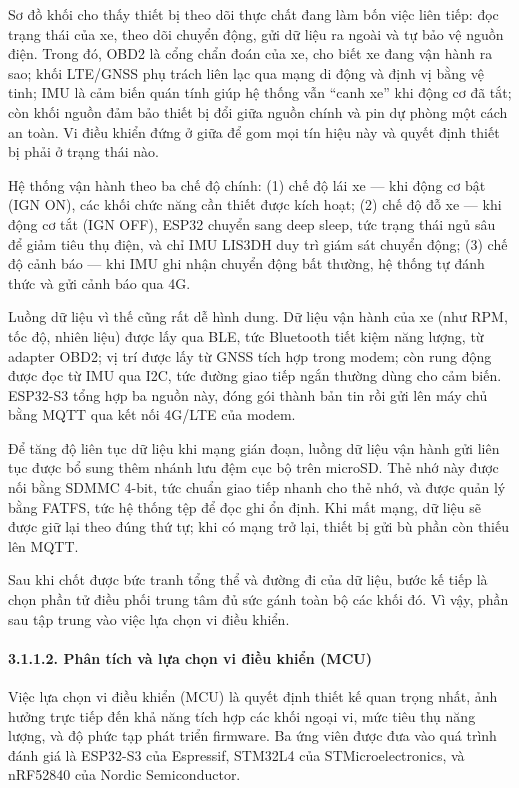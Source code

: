 \documentclass[a4paper]{extarticle}
\begin{document}
Sơ đồ khối cho thấy thiết bị theo dõi thực chất đang làm bốn việc liên tiếp: đọc
trạng thái của xe, theo dõi chuyển động, gửi dữ liệu ra ngoài và tự bảo
vệ nguồn điện. Trong đó, OBD2 là cổng chẩn đoán của xe, cho biết xe đang
vận hành ra sao; khối LTE/GNSS phụ trách liên lạc qua mạng di động và
định vị bằng vệ tinh; IMU là cảm biến quán tính giúp hệ thống vẫn ``canh
xe'' khi động cơ đã tắt; còn khối nguồn đảm bảo thiết bị đổi giữa nguồn
chính và pin dự phòng một cách an toàn. Vi điều khiển đứng ở giữa để gom
mọi tín hiệu này và quyết định thiết bị phải ở trạng thái nào.

Hệ thống vận hành theo ba chế độ chính: (1) chế độ lái xe --- khi động cơ
bật (IGN ON), các khối chức năng cần thiết được kích hoạt; (2) chế độ đỗ
xe --- khi động cơ tắt (IGN OFF), ESP32 chuyển sang deep sleep, tức trạng
thái ngủ sâu để giảm tiêu thụ điện, và chỉ IMU LIS3DH duy trì giám sát
chuyển động; (3) chế độ cảnh báo --- khi IMU ghi nhận chuyển động bất
thường, hệ thống tự đánh thức và gửi cảnh báo qua 4G.

Luồng dữ liệu vì thế cũng rất dễ hình dung. Dữ liệu vận hành của xe
(như RPM, tốc độ, nhiên liệu) được lấy qua BLE, tức Bluetooth tiết kiệm
năng lượng, từ adapter OBD2; vị trí được lấy từ GNSS tích hợp trong
modem; còn rung động được đọc từ IMU qua I2C, tức đường giao tiếp ngắn
thường dùng cho cảm biến. ESP32-S3 tổng hợp ba nguồn này, đóng gói thành
bản tin rồi gửi lên máy chủ bằng MQTT qua kết nối 4G/LTE của modem.

Để tăng độ liên tục dữ liệu khi mạng gián đoạn, luồng dữ liệu vận hành
gửi liên tục được bổ sung thêm nhánh lưu đệm cục
bộ trên microSD. Thẻ nhớ này được nối bằng SDMMC 4-bit, tức chuẩn giao
tiếp nhanh cho thẻ nhớ, và được quản lý bằng FATFS, tức hệ thống tệp để
đọc ghi ổn định. Khi mất mạng, dữ liệu sẽ được giữ lại theo đúng thứ tự;
khi có mạng trở lại, thiết bị gửi bù phần còn thiếu lên MQTT.

Sau khi chốt được bức tranh tổng thể và đường đi của dữ liệu, bước kế
tiếp là chọn phần tử điều phối trung tâm đủ sức gánh toàn bộ các khối
đó. Vì vậy, phần sau tập trung vào việc lựa chọn vi điều khiển.

\paragraph{3.1.1.2. Phân tích và lựa chọn vi điều khiển
(MCU)}\label{3112-phuxe2n-tuxedch-vuxe0-lux1ef1a-chux1ecdn-vi-ux111iux1ec1u-khiux1ec3n-mcu}

Việc lựa chọn vi điều khiển (MCU) là quyết định thiết kế quan trọng
nhất, ảnh hưởng trực tiếp đến khả năng tích hợp các khối ngoại vi, mức
tiêu thụ năng lượng, và độ phức tạp phát triển firmware. Ba ứng viên
được đưa vào quá trình đánh giá là ESP32-S3 của Espressif, STM32L4 của
STMicroelectronics, và nRF52840 của Nordic Semiconductor.
\end{document}
